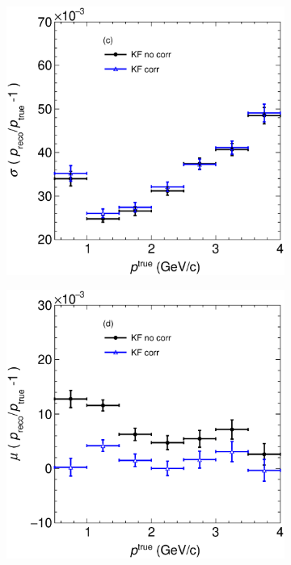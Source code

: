 \begin{figure}[t]
\begin{subfigure}[b]{0.42\textwidth}
         \caption{}
         \label{fig:ToyResPVSN_GArLite_Bias}
     \end{subfigure}
     \begin{subfigure}[b]{0.42\textwidth}
         \centering
         \includegraphics[width=\textwidth]{figures/ch4-KF_NDGArLite/Toy/RespVSp.eps}
         \caption{}
         \label{fig:ToyResPVSp_GArLite_Res}
     \end{subfigure}
     \begin{subfigure}[b]{0.42\textwidth}
         \centering
         \includegraphics[width=\textwidth]{figures/ch4-KF_NDGArLite/Toy/BiaspVSp.eps}

\end{subfigure}
\end{figure}
